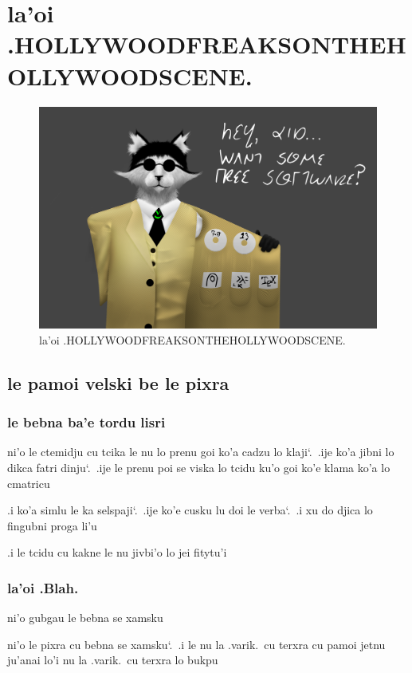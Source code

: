 \documentclass{report}
\newcommand\sds{\spacefactor\sfcode`.\ \space}
\begin{document}
\chapter{la'oi .HOLLYWOODFREAKSONTHEHOLLYWOODSCENE.}
\begin{figure}[ht]
	\centering
	\includegraphics[keepaspectratio, width=\textwidth, height=0.75\textheight]{hollywoodfreaksonthehollywoodscene/hollywoodfreaksonthehollywoodscene.png}
	\caption[center]{la'oi .HOLLYWOODFREAKSONTHEHOLLYWOODSCENE.}
\end{figure}
\section{le pamoi velski be le pixra}
\subsection{le bebna ba'e tordu lisri}
ni'o le ctemidju cu tcika le nu lo prenu goi ko'a cadzu lo klaji\sds  .ije ko'a jibni lo dikca fatri dinju\sds  .ije le prenu poi se viska lo tcidu ku'o goi ko'e klama ko'a lo cmatricu

.i ko'a simlu le ka selspaji\sds  .ije ko'e cusku lu doi le verba\sds  .i xu do djica lo fingubni proga li'u

.i le tcidu cu kakne le nu jivbi'o lo jei fitytu'i

\subsection{la'oi .Blah.}
ni'o gubgau le bebna se xamsku

ni'o le pixra cu bebna se xamsku\sds  .i le nu la .varik.\ cu terxra cu pamoi jetnu ju'anai lo'i nu la .varik.\ cu terxra lo bukpu
\end{document}
